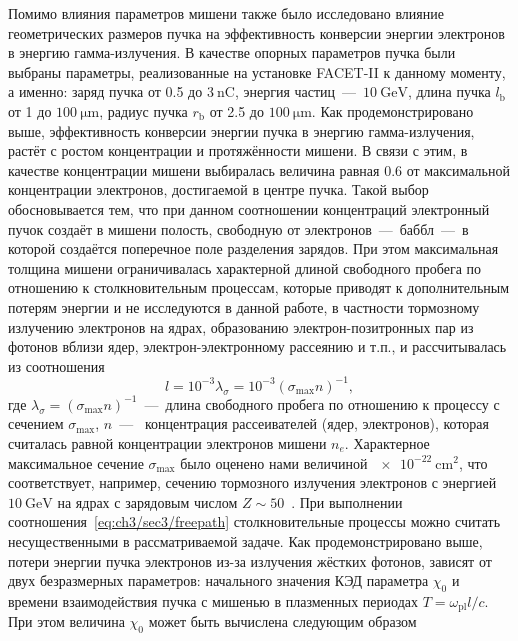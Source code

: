 Помимо влияния параметров мишени также было исследовано влияние геометрических размеров пучка на эффективность конверсии энергии электронов в энергию гамма-излучения.
В качестве опорных параметров пучка были выбраны параметры, реализованные на установке FACET-II к данному моменту, а именно: заряд пучка от 0.5 до $\SI{3}{\nano\coulomb}$, энергия частиц~---~$\SI{10}{\giga\electronvolt}$, длина пучка $l_\mathrm{b}$ от 1 до $\SI{100}{\um}$, радиус пучка $r_\mathrm{b}$ от 2.5 до $\SI{100}{\um}$.
Как продемонстрировано выше, эффективность конверсии энергии пучка в энергию гамма-излучения, растёт с ростом концентрации и протяжённости мишени.
В связи с этим, в качестве концентрации мишени выбиралась величина равная 0.6 от максимальной концентрации электронов, достигаемой в центре пучка.
Такой выбор обосновывается тем, что при данном соотношении концентраций электронный пучок создаёт в мишени полость, свободную от электронов~---~баббл~---~в которой создаётся поперечное поле разделения зарядов.
При этом максимальная толщина мишени ограничивалась характерной длиной свободного пробега по отношению к столкновительным процессам, которые приводят к дополнительным потерям энергии и не исследуются в данной работе, в частности тормозному излучению электронов на ядрах, образованию электрон-позитронных пар из фотонов вблизи ядер, электрон-электронному рассеянию и т.п., и рассчитывалась из соотношения
\begin{equation}
    \label{eq:ch3/sec3/freepath}
    l = 10^{-3} \lambda_\sigma = 10^{-3} \left( \sigma_\mathrm{max} n \right)^{-1},
\end{equation}
где $\lambda_\sigma = ( \sigma_\mathrm{max} n )^{-1}$~---~длина свободного пробега по отношению к процессу с сечением $\sigma_\mathrm{max}$, $n$~---~ концентрация рассеивателей (ядер, электронов), которая считалась равной концентрации электронов мишени $n_e$.
Характерное максимальное сечение $\sigma_\mathrm{max}$ было оценено нами величиной $\SI{e-22}{\centi\meter^2}$, что соответствует, например, сечению тормозного излучения электронов с энергией $\SI{10}{\giga\electronvolt}$ на ядрах с зарядовым числом $Z \sim 50$~\cite{berestetskii1982quantum}.
При выполнении соотношения~\eqref{eq:ch3/sec3/freepath} столкновительные процессы можно считать несущественными в рассматриваемой задаче. 
Как продемонстрировано выше, потери энергии пучка электронов из-за излучения жёстких фотонов, зависят от двух безразмерных параметров: начального значения КЭД параметра $\chi_0$ и времени взаимодействия пучка с мишенью в плазменных периодах $T = \omega_\mathrm{pl} l / c$.
При этом величина $\chi_0$ может быть вычислена следующим образом
